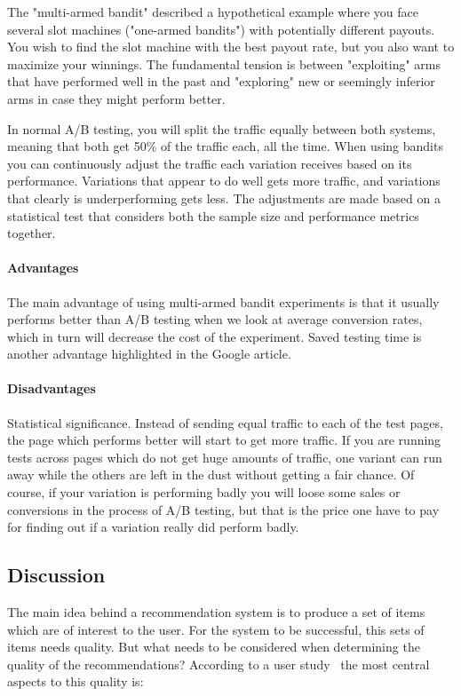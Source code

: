 The "multi-armed bandit" described a hypothetical example where you face
several slot machines ("one-armed bandits") with potentially different payouts.
You wish to find the slot machine with the best payout rate, but you also want
to maximize your winnings. The fundamental tension is between "exploiting" arms
that have performed well in the past and "exploring" new or seemingly inferior
arms in case they might perform better.

In normal A/B testing, you will split the traffic equally between both systems,
meaning that both get 50\% of the traffic each, all the time. When using
bandits you can continuously adjust the traffic each variation receives based
on its performance. Variations that appear to do well gets more traffic, and
variations that clearly is underperforming gets less. The adjustments are made
based on a statistical test that considers both the sample size and performance
metrics together.

\paragraph{Advantages}

The main advantage of using multi-armed bandit experiments is that it usually
performs better than A/B testing when we look at average conversion rates,
which in turn will decrease the cost of the experiment.  Saved testing time is
another advantage highlighted in the Google article.

\paragraph{Disadvantages}

Statistical significance. Instead of sending equal traffic to each of the test
pages, the page which performs better will start to get more traffic. If you
are running tests across pages which do not get huge amounts of traffic, one
variant can run away while the others are left in the dust without getting a
fair chance. Of course, if your variation is performing badly you will loose
some sales or conversions in the process of A/B testing, but that is the price
one have to pay for finding out if a variation really did perform badly.

\subsection{Discussion}

The main idea behind a recommendation system is to produce a set of items which
are of interest to the user.  For the system to be successful, this sets of
items needs quality.  But what needs to be considered when determining the
quality of the recommendations?  According to a user
study~\cite{Pu:2011:UEF:2043932.2043962} the most central aspects to this
quality is:

